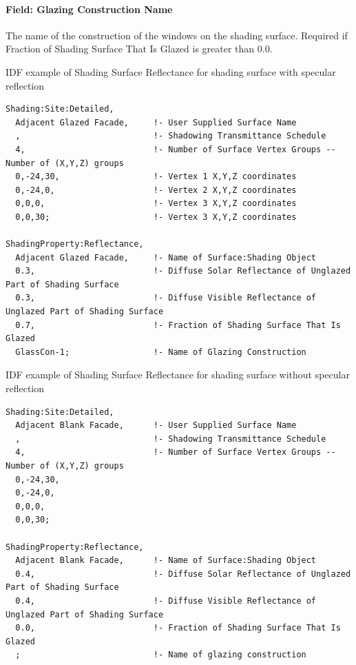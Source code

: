 \paragraph{Field: Glazing Construction Name}\label{field-glazing-construction-name}

The name of the construction of the windows on the shading surface. Required if Fraction of Shading Surface That Is Glazed is greater than 0.0.

IDF example of Shading Surface Reflectance for shading surface with specular reflection

\begin{lstlisting}
Shading:Site:Detailed,
  Adjacent Glazed Facade,     !- User Supplied Surface Name
  ,                           !- Shadowing Transmittance Schedule
  4,                          !- Number of Surface Vertex Groups -- Number of (X,Y,Z) groups
  0,-24,30,                   !- Vertex 1 X,Y,Z coordinates
  0,-24,0,                    !- Vertex 2 X,Y,Z coordinates
  0,0,0,                      !- Vertex 3 X,Y,Z coordinates
  0,0,30;                     !- Vertex 3 X,Y,Z coordinates

ShadingProperty:Reflectance,
  Adjacent Glazed Facade,     !- Name of Surface:Shading Object
  0.3,                        !- Diffuse Solar Reflectance of Unglazed Part of Shading Surface
  0.3,                        !- Diffuse Visible Reflectance of Unglazed Part of Shading Surface
  0.7,                        !- Fraction of Shading Surface That Is Glazed
  GlassCon-1;                 !- Name of Glazing Construction
\end{lstlisting}

IDF example of Shading Surface Reflectance for shading surface without specular reflection

\begin{lstlisting}
Shading:Site:Detailed,
  Adjacent Blank Facade,      !- User Supplied Surface Name
  ,                           !- Shadowing Transmittance Schedule
  4,                          !- Number of Surface Vertex Groups -- Number of (X,Y,Z) groups
  0,-24,30,
  0,-24,0,
  0,0,0,
  0,0,30;

ShadingProperty:Reflectance,
  Adjacent Blank Facade,      !- Name of Surface:Shading Object
  0.4,                        !- Diffuse Solar Reflectance of Unglazed Part of Shading Surface
  0.4,                        !- Diffuse Visible Reflectance of Unglazed Part of Shading Surface
  0.0,                        !- Fraction of Shading Surface That Is Glazed
  ;                           !- Name of glazing construction
\end{lstlisting}

